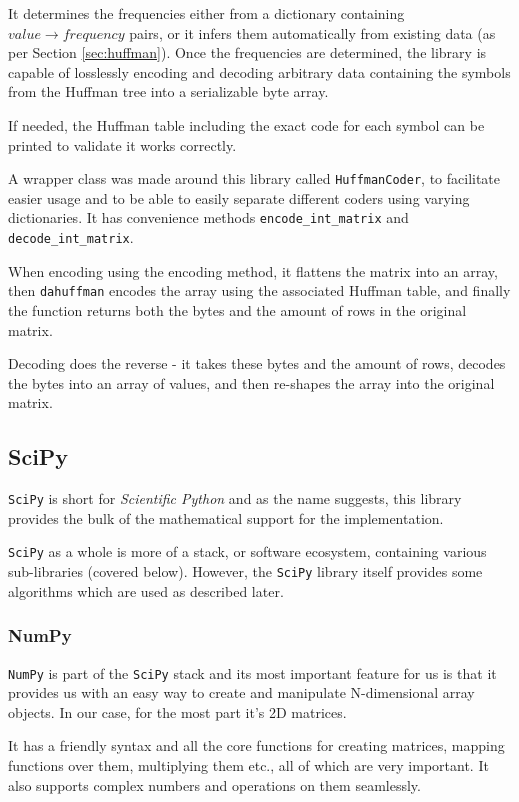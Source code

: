 It determines the frequencies either from a dictionary containing $value \rightarrow frequency$ pairs, or it infers them automatically from existing data (as per Section \ref{sec:huffman}). Once the frequencies are determined, the library is capable of losslessly encoding and decoding arbitrary data containing the symbols from the Huffman tree into a serializable byte array.

If needed, the Huffman table including the exact code for each symbol can be printed to validate it works correctly.

A wrapper class was made around this library called \verb|HuffmanCoder|, to facilitate easier usage and to be able to easily separate different coders using varying dictionaries. It has convenience methods \verb|encode_int_matrix| and \verb|decode_int_matrix|.

When encoding using the encoding method, it flattens the matrix into an array, then \verb|dahuffman| encodes the array using the associated Huffman table, and finally the function returns both the bytes and the amount of rows in the original matrix.

Decoding does the reverse - it takes these bytes and the amount of rows, decodes the bytes into an array of values, and then re-shapes the array into the original matrix.

\subsection{SciPy}
\verb|SciPy| \cite{py_scipy} is short for \emph{Scientific Python} and as the name suggests, this library provides the bulk of the mathematical support for the implementation.

\verb|SciPy| as a whole is more of a stack, or software ecosystem, containing various sub-libraries (covered below). However, the \verb|SciPy| library itself provides some algorithms which are used as described later.

\subsubsection{NumPy}
\verb|NumPy| \cite{py_numpy} is part of the \verb|SciPy| stack and its most important feature for us is that it provides us with an easy way to create and manipulate N-dimensional array objects. In our case, for the most part it's 2D matrices.

It has a friendly syntax and all the core functions for creating matrices, mapping functions over them, multiplying them etc., all of which are very important. It also supports complex numbers and operations on them seamlessly.

